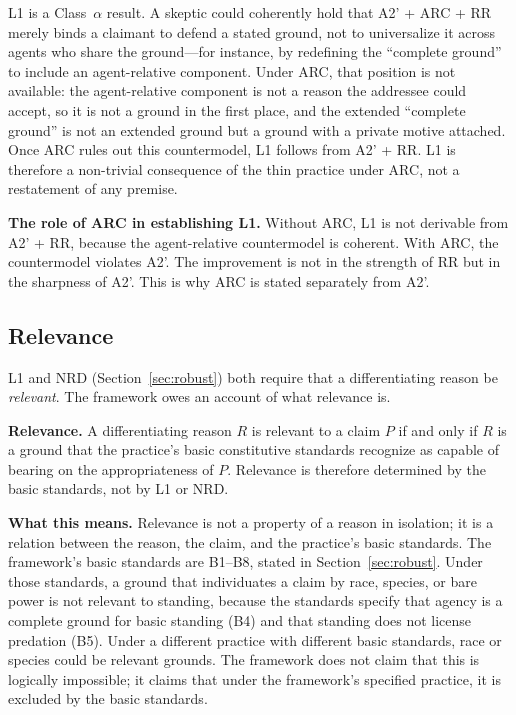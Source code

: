 \documentclass[11pt]{article}
\def\ensuremath#1{#1}%
\def\mathrm#1{#1}%
\newcommand{\Atwo}{\texorpdfstring{\ensuremath{\mathrm{A2}'}}{A2'}}
\newcommand{\ca}{\texorpdfstring{Class~$\alpha$}{Class alpha}}
\begin{document}
L1 is a \ca{} result. A skeptic could coherently hold that \Atwo{} + ARC + RR merely binds a claimant to defend a stated ground, not to universalize it across agents who share the ground---for instance, by redefining the ``complete ground'' to include an agent-relative component. Under ARC, that position is not available: the agent-relative component is not a reason the addressee could accept, so it is not a ground in the first place, and the extended ``complete ground'' is not an extended ground but a ground with a private motive attached. Once ARC rules out this countermodel, L1 follows from \Atwo{} + RR. L1 is therefore a non-trivial consequence of the thin practice under ARC, not a restatement of any premise.

\textbf{The role of ARC in establishing L1.} Without ARC, L1 is not derivable from \Atwo{} + RR, because the agent-relative countermodel is coherent. With ARC, the countermodel violates \Atwo{}. The improvement is not in the strength of RR but in the sharpness of \Atwo{}. This is why ARC is stated separately from \Atwo{}.

\subsection{Relevance}
L1 and NRD (Section~\ref{sec:robust}) both require that a differentiating reason be \emph{relevant}. The framework owes an account of what relevance is.
\begin{paperbox}
\textbf{Relevance.} A differentiating reason $R$ is relevant to a claim $P$ if and only if $R$ is a ground that the practice's basic constitutive standards recognize as capable of bearing on the appropriateness of $P$. Relevance is therefore determined by the basic standards, not by L1 or NRD.
\end{paperbox}

\textbf{What this means.} Relevance is not a property of a reason in isolation; it is a relation between the reason, the claim, and the practice's basic standards. The framework's basic standards are B1--B8, stated in Section~\ref{sec:robust}. Under those standards, a ground that individuates a claim by race, species, or bare power is not relevant to standing, because the standards specify that agency is a complete ground for basic standing (B4) and that standing does not license predation (B5). Under a different practice with different basic standards, race or species could be relevant grounds. The framework does not claim that this is logically impossible; it claims that under the framework's specified practice, it is excluded by the basic standards.
\end{document}
